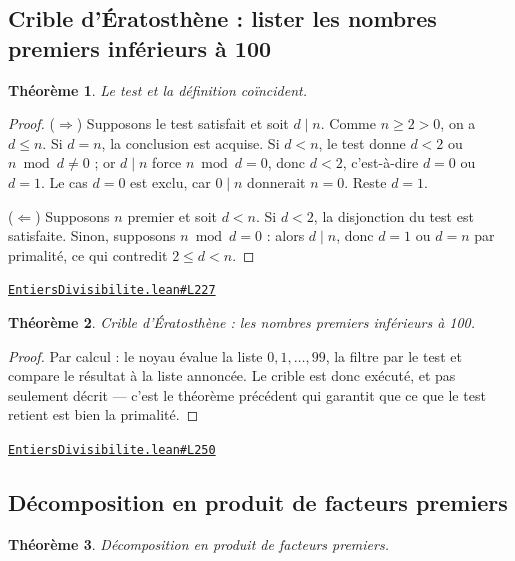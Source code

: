 \documentclass[11pt,a4paper]{article}
\theoremstyle{definition}
\theoremstyle{plain}
\newtheorem{theoreme}{Théorème}
\newcommand{\source}[2]{\par\smallskip\noindent\hfill{\footnotesize\href{#1}{\texttt{#2}}}\par\smallskip}
\begin{document}
\subsection{Crible d'Ératosthène : lister les nombres premiers inférieurs à 100}

\begin{theoreme}
Le test et la définition coïncident.
\end{theoreme}

\begin{proof}
($\Rightarrow$) Supposons le test satisfait et soit $d \mid n$. Comme $n \ge 2 > 0$, on a
$d \le n$. Si $d = n$, la conclusion est acquise. Si $d < n$, le test donne $d < 2$ ou
$n \bmod d \ne 0$ ; or $d \mid n$ force $n \bmod d = 0$, donc $d < 2$, c'est-à-dire
$d = 0$ ou $d = 1$. Le cas $d = 0$ est exclu, car $0 \mid n$ donnerait $n = 0$. Reste
$d = 1$.

($\Leftarrow$) Supposons $n$ premier et soit $d < n$. Si $d < 2$, la disjonction du test
est satisfaite. Sinon, supposons $n \bmod d = 0$ : alors $d \mid n$, donc $d = 1$ ou
$d = n$ par primalité, ce qui contredit $2 \le d < n$.
\end{proof}
\source{https://github.com/Commutator-IO/learn-lean/blob/main/cours/01-college/01-nombres-et-calculs/EntiersDivisibilite.lean\#L227}{EntiersDivisibilite.lean\#L227}

\begin{theoreme}
Crible d'Ératosthène : les nombres premiers inférieurs à 100.
\end{theoreme}

\begin{proof}
Par calcul : le noyau évalue la liste $0, 1, \dots, 99$, la filtre par le test et compare
le résultat à la liste annoncée. Le crible est donc exécuté, et pas seulement décrit —
c'est le théorème précédent qui garantit que ce que le test retient est bien la
primalité.
\end{proof}
\source{https://github.com/Commutator-IO/learn-lean/blob/main/cours/01-college/01-nombres-et-calculs/EntiersDivisibilite.lean\#L250}{EntiersDivisibilite.lean\#L250}

\subsection{Décomposition en produit de facteurs premiers}

\begin{theoreme}
Décomposition en produit de facteurs premiers.
\end{theoreme}
\end{document}
